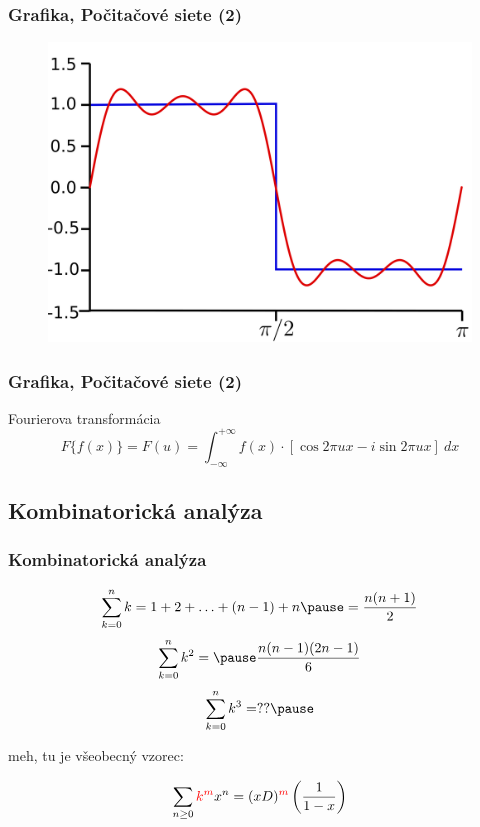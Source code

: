 \documentclass{beamer}
\begin{document}
\begin{frame}
\frametitle{Grafika, Počitačové siete (2)}
\begin{figure}
\includegraphics[height=0.8\textheight]{images/fourier_signal.png}
\end{figure}
\end{frame}


\begin{frame}
\frametitle{Grafika, Počitačové siete (2)}
\begin{block}{Fourierova transformácia}
$$F\{f(x)\} = F(u) = \int_{-\infty}^{+\infty} f(x) \cdot [\cos{2\pi ux} - i \sin{2\pi ux}] ~ dx$$
\end{block}
\end{frame}

\subsection{Kombinatorická analýza}

\begin{frame}
\frametitle{Kombinatorická analýza}
\pause
$$\sum_{k=0}^{n} k = 1 + 2 + \ldots + (n-1) + n \pause = \dfrac{n(n+1)}{2}$$
\pause
$$\sum_{k=0}^{n} k^2 = \pause \dfrac{n(n-1)(2n-1)}{6}$$
\pause
$$\sum_{k=0}^{n} k^3 = ?? \pause $$

meh, tu je všeobecný vzorec:

$$\sum_{n \geq 0} \textcolor{red}{k^m} x^n = (xD)^{\textcolor{red}{m}} \left(\dfrac{1}{1-x}\right)$$
\end{frame}
\end{document}
